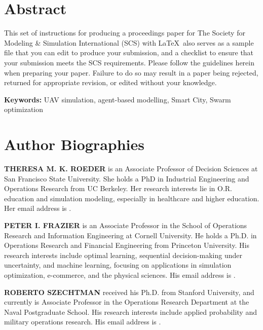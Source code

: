 \documentclass{scspaperproc}
\theoremstyle{scsthe}
\begin{document}
\section*{Abstract}

This set of instructions for producing a proceedings paper for The Society for Modeling \& Simulation International (SCS) with \LaTeX\ also serves as a sample file that you can edit to produce your submission, and a checklist to ensure that your submission meets the SCS requirements. Please follow the guidelines herein when preparing your paper. Failure to do so may result in a paper being rejected, returned for appropriate revision, or edited without your knowledge.

\textbf{Keywords:} UAV simulation, agent-based modelling, Smart City, Swarm optimization






\section*{Author Biographies}

\textbf{\uppercase{THERESA M. K. ROEDER}} is an Associate Professor of Decision Sciences at San Francisco State University. She holds a PhD in Industrial Engineering and Operations Research from UC Berkeley. Her research interests lie in O.R. education and simulation modeling, especially in healthcare and higher education. Her email address is .

\textbf{\uppercase{PETER I. FRAZIER}} is an Associate Professor in the School of Operations Research and Information Engineering at Cornell University. He holds a Ph.D. in Operations Research and Financial Engineering from Princeton University. His research interests include optimal learning, sequential decision-making under uncertainty, and machine learning, focusing on applications in simulation optimization, e-commerce, and the physical sciences.  His email address is .

\textbf{\uppercase{ROBERTO SZECHTMAN}} received his Ph.D. from Stanford University, and currently is Associate Professor in the Operations Research Department at the Naval Postgraduate School. His research interests include applied probability and military operations research. His email address is .
\end{document}
